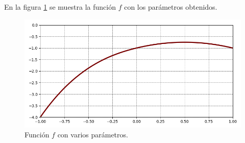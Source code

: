 \begin{enumerate}
	      En la figura \ref{fig:problema02b} se muestra la función $f$ con los parámetros obtenidos.
	      \begin{figure}[H]
		      \centering
		      \includegraphics[width=14cm]{Graphics/problema02b.png}
		      \caption{Función $f$ con varios parámetros.}
		      \label{fig:problema02b}
	      \end{figure}
\end{enumerate}
\pagebreak

